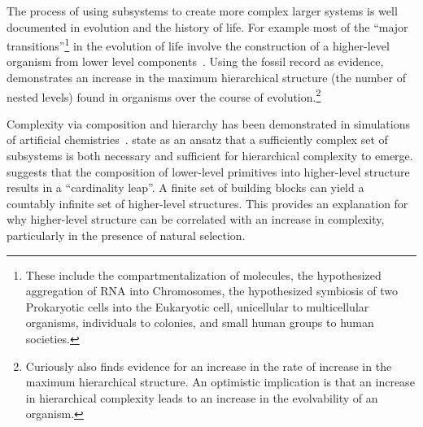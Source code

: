 The process of using subsystems to create more complex larger systems is well
documented in evolution and the history of life. For example most of the
``major transitions''\footnote{These include the compartmentalization of
molecules, the hypothesized aggregation of RNA into Chromosomes, the
hypothesized symbiosis of two Prokaryotic cells into the Eukaryotic cell,
unicellular to multicellular organisms, individuals to colonies, and small
human groups to human societies.} in the evolution of life involve the
construction of a higher-level organism from lower level
components~\citep{smith1997major}. Using the fossil record as evidence,
\citet{mcshea2001hierarchical} demonstrates an increase in the maximum
hierarchical structure (the number of nested levels) found in organisms over
the course of evolution.\footnote{Curiously \citet{mcshea2001hierarchical} also
finds evidence for an increase in the rate of increase in the maximum
hierarchical structure. An optimistic implication is that an increase in
hierarchical complexity leads to an increase in the evolvability of an
organism.}  

Complexity via composition and hierarchy has been demonstrated in simulations
of artificial chemistries~\citep{rasmussen2001ansatz, sayama2019cardinality}.
\citet{rasmussen2001ansatz} state as an ansatz that a sufficiently
complex set of subsystems is both necessary and sufficient for hierarchical
complexity to emerge. \citet{sayama2019cardinality} suggests that the
composition of lower-level primitives into higher-level structure results in a
``cardinality leap''. A finite set of building blocks can yield a countably
infinite set of higher-level structures. This provides an explanation for why
higher-level structure can be correlated with an increase in complexity,
particularly in the presence of natural selection.

